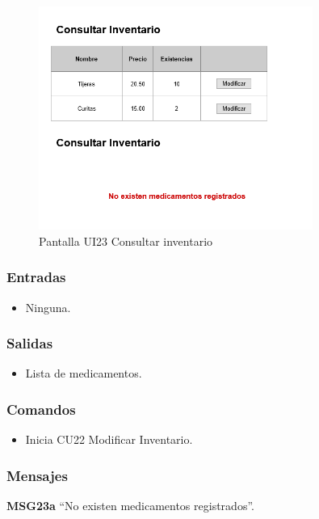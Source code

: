 \begin{figure}[htbp!]
	\centering
	\includegraphics[width=0.8\textwidth]{images/gui/ui23_consultar_inventario}
	\caption{Pantalla UI23 Consultar inventario}
\end{figure}

\subsubsection{Entradas}
\begin{itemize}
	\item Ninguna.
\end{itemize}

\subsubsection{Salidas}
\begin{itemize}
	\item Lista de medicamentos.
\end{itemize}

\subsubsection{Comandos}
\begin{itemize}
	\item {} Inicia CU22 Modificar Inventario.
\end{itemize}

\subsubsection{Mensajes}
\begin{Citemize}
	\item {\bf MSG23a} ``No existen medicamentos registrados''.
\end{Citemize}

